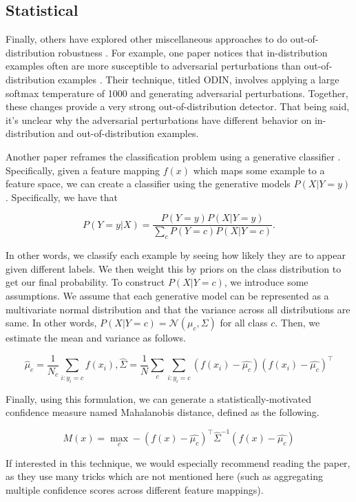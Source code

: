 \documentclass{article}
\begin{document}
\subsection{Statistical}
Finally, others have explored other miscellaneous approaches to do out-of-distribution robustness \cite{liang2020enhancing, lee2018simple}. For example, one paper notices that in-distribution examples often are more susceptible to adversarial perturbations than out-of-distribution examples \cite{liang2020enhancing}. Their technique, titled ODIN, involves applying a large softmax temperature of 1000 and generating adversarial perturbations. Together, these changes provide a very strong out-of-distribution detector. That being said, it’s unclear why the adversarial perturbations have different behavior on in-distribution and out-of-distribution examples. 

Another paper reframes the classification problem using a generative classifier \cite{lee2018simple}. Specifically, given a feature mapping $f(x)$ which maps some example to a feature space, we can create a classifier using the generative models $P(X|Y = y)$. Specifically, we have that

\[
    P(Y = y|X) = \frac{P(Y=y)P(X|Y=y)}{\sum_c P(Y=c)P(X|Y=c)}.
\]

\noindent In other words, we classify each example by seeing how likely they are to appear given different labels. We then weight this by priors on the class distribution to get our final probability. To construct $P(X|Y=c)$, we introduce some assumptions. We assume that each generative model can be represented as a multivariate normal distribution and that the variance across all distributions are same. In other words, $P(X|Y=c) = \mathcal{N}(\mu_c, \Sigma)$ for all class $c$. Then, we estimate the mean and variance as follows.

\[
    \hat{\mu}_c = \frac{1}{N_c} \sum_{i:y_i=c} f(x_i), \hat{\Sigma} = \frac{1}{N} \sum_c \sum_{i:y_i = c} (f(x_i) - \hat{\mu_c})(f(x_i) - \hat{\mu_c})^\top
\]

\noindent Finally, using this formulation, we can generate a statistically-motivated confidence measure named Mahalanobis distance, defined as the following.

\[
    M(x) = \max_c - (f(x) - \hat{\mu_c})^\top \hat{\Sigma}^{-1}(f(x) - \hat{\mu_c})
\]

\noindent If interested in this technique, we would especially recommend reading the paper, as they use many tricks which are not mentioned here (such as aggregating multiple confidence scores across different feature mappings). 
\end{document}
